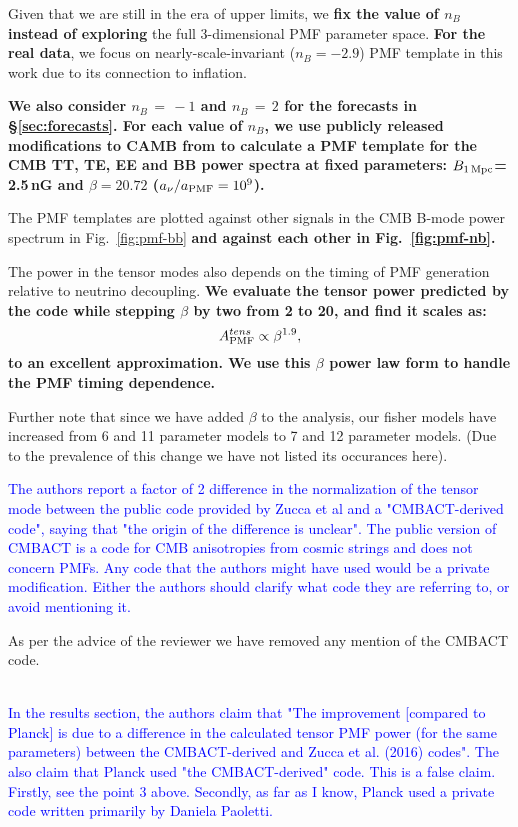 \documentclass{article}
\newcommand{\apmf}{\ensuremath{A_{\rm PMF}}}
\newcommand{\bpmf}{\ensuremath{B_{\rm 1\,Mpc}}}
\newcommand{\be}{\begin{equation}}
\newcommand{\ee}{\end{equation}}
\newcommand{\added}[1]{\textbf{#1}}
\newcommand{\reviewer}[1]{\textcolor{Blue}{#1}}
\newcommand{\diff}[1]{\textcolor{PineGreen}{#1}}
\begin{document}
\diff{Given that we are still in the era of upper limits, we \added{fix the value of $n_B$ instead of exploring} the full 3-dimensional PMF parameter space. 
\added{For the real data}, we focus on nearly-scale-invariant ($n_B = -2.9$) PMF template in this work due to its connection to inflation.}

\diff{\added{We also consider $n_B\,=\,-1$ and $n_B\,=\,2$ for the forecasts in \S\ref{sec:forecasts}. 
For each value of $n_B$, we use publicly released modifications to CAMB from \citet{zucca16} to calculate a PMF template for the CMB TT, TE, EE and BB power spectra at fixed parameters: \bpmf = 2.5\,nG and $\beta=20.72$ ($a_{\nu}/a_{\rm{PMF}} = 10^9$).}}

\diff{The PMF templates are plotted against other signals in the CMB B-mode power spectrum in Fig.~\ref{fig:pmf-bb} \added{and against each other in Fig.~\ref{fig:pmf-nb}. }}

\diff{The power in the tensor modes also depends on the timing of PMF generation relative to neutrino decoupling. 
\added{We evaluate the tensor power predicted by the \citet{zucca16} code while stepping $\beta$ by two from 2 to 20, and find it scales as:
\be \label{eqn:betascaling}
\apmf^{tens} \propto \beta^{1.9},
\ee
to an excellent approximation. 
We use this $\beta$ power law form to handle the PMF timing dependence.}}


Further note that since we have added $\beta$ to the analysis, our fisher models have increased from 6 and 11 parameter models to 7 and 12 parameter models. (Due to the prevalence of this change we have not listed its occurances here).


\reviewer{The authors report a factor of 2 difference in the normalization of the tensor mode between the public code provided by Zucca et al and a "CMBACT-derived code", saying that "the origin of the difference is unclear". The public version of CMBACT is a code for CMB anisotropies from cosmic strings and does not concern PMFs. Any code that the authors might have used would be a private modification. Either the authors should clarify what code they are referring to, or avoid mentioning it.}

As per the advice of the reviewer we have removed any mention of the CMBACT code.

\diff{}
\\

\reviewer{In the results section, the authors claim that "The improvement [compared to Planck] is due to a difference in the calculated tensor PMF power (for the same
parameters) between the CMBACT-derived and Zucca et al. (2016) codes". The also claim that Planck used "the CMBACT-derived" code. This is a false claim. Firstly, see the point 3 above. Secondly, as far as I know, Planck used a private code written primarily by Daniela Paoletti.}
\end{document}
